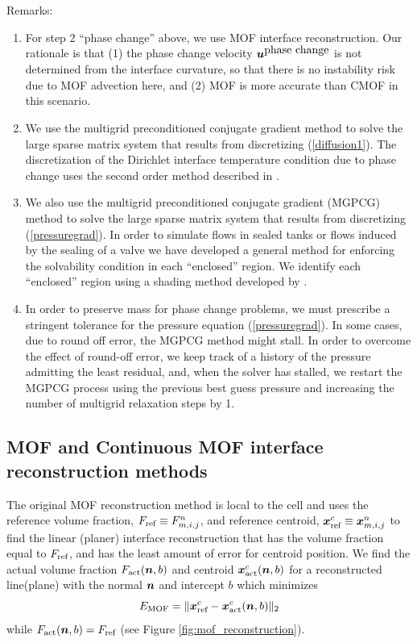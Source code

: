 \documentclass[]{article}
\newcommand{\tn}{\textnormal}
\newcommand{\bmu}{\mbox{\boldmath $u$\unboldmath}}
\newcommand{\bmx}{\mbox{\boldmath $x$\unboldmath}}
\newcommand{\bmn}{\mbox{\boldmath $n$\unboldmath}}
\begin{document}
Remarks:
\begin{enumerate}
\item For step 2 ``phase change'' above, we use MOF interface
 reconstruction.   Our rationale is that (1) the phase change
 velocity $\bmu^{\mbox{phase change}}$ is not  
 determined from the interface curvature, so that there is no
 instability risk due to MOF advection here, and (2) MOF is
 more accurate than CMOF in this scenario.
\item We use the multigrid preconditioned conjugate gradient 
 method \cite{tatebe1993multigrid}
 to solve the large sparse matrix system that
 results from discretizing (\ref{diffusion1}).  The discretization
 of the Dirichlet interface temperature condition due to 
 phase change uses the second order method described in 
 \cite{gibou2002second}.
\item We also use the multigrid preconditioned conjugate gradient (MGPCG)
 method \cite{tatebe1993multigrid}
 to solve the large sparse matrix system that
 results from discretizing (\ref{pressuregrad}).  In order
 to simulate flows in sealed tanks or flows induced by the 
 sealing of a valve \cite{arienti2014embedded} we have developed a general 
 method for enforcing the solvability condition in each 
 ``enclosed'' region.  We identify each ``enclosed'' region
 using a shading method developed by \cite{sussman2009stable}.
\item In order to preserve mass for phase change problems, we
  must prescribe a stringent tolerance for the pressure equation
  (\ref{pressuregrad}).  In some cases, due to round off error, the
  MGPCG method might stall.  In order to overcome the effect of 
  round-off error, we keep track of a history of the pressure
  admitting the least residual, and, when the solver has stalled,
  we restart the MGPCG process using the
  previous best guess pressure and
  increasing the number of multigrid relaxation steps by 1.
\end{enumerate}

\subsection{MOF and Continuous MOF interface reconstruction methods
  \label{MOF_vs_CMOF_sec} }
The original MOF reconstruction method is local to the cell and 
uses the reference volume fraction, $F_\tn{ref} \equiv F_{m,i,j}^n$, 
and reference centroid, $\bmx_\tn{ref}^c \equiv \bmx_{m,i,j}^n$ to 
find the linear (planer) interface reconstruction that has the volume
fraction equal to $F_\tn{ref}$, and has the least amount of error 
for centroid position. We find the actual volume fraction 
$F_\tn{act}(\bmn,b)$ and centroid $\bmx_\tn{act}^c(\bmn,b)$ 
for a reconstructed line(plane) with the normal $\bmn$ and 
intercept $b$ which minimizes
\begin{equation}
  E_\tn{MOF} = \lVert \bmx_\tn{ref}^c - \bmx_\tn{act}^c(\bmn,b) \rVert_2
\end{equation}
while $F_\tn{act}(\bmn,b) = F_\tn{ref}$ (see Figure
\ref{fig:mof_reconstruction}).
\end{document}
